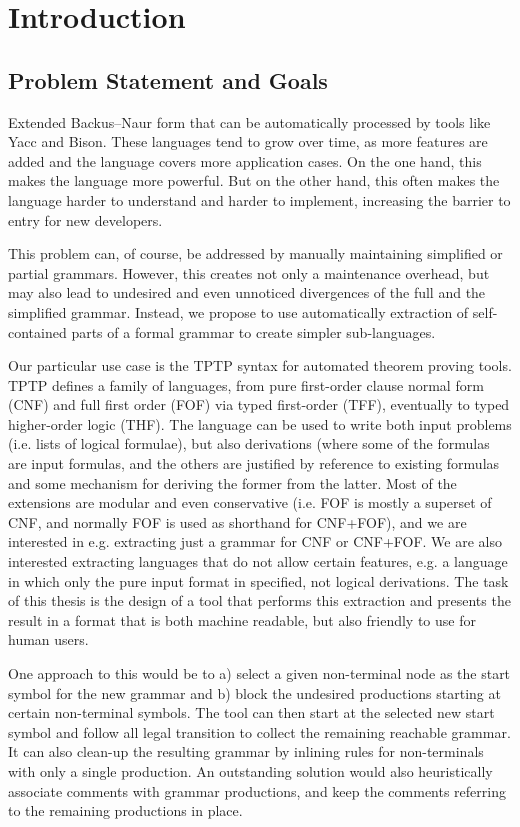 
\chapter{Introduction}\label{cha:Introduction}

\section{Problem Statement and Goals}\label{sec:Aufgabenstellung}
Extended Backus–Naur form that can be automatically processed by tools like Yacc and Bison. These languages tend to grow over time, as more features are added and the language covers more application cases. On the one hand, this makes the language more powerful. But on the other hand, this often makes the language harder to understand and harder to implement, increasing the barrier to entry for new developers.

This problem can, of course, be addressed by manually maintaining simplified or partial grammars. However, this creates not only a maintenance overhead, but may also lead to undesired and even unnoticed divergences of the full and the simplified grammar. Instead, we propose to use automatically extraction of self-contained parts of a formal grammar to create simpler sub-languages.

Our particular use case is the TPTP syntax for automated theorem proving tools. TPTP defines a family of languages, from pure first-order clause normal form (CNF) and full first order (FOF) via typed first-order (TFF), eventually to typed higher-order logic (THF). The language can be used to write both input problems (i.e. lists of logical formulae), but also derivations (where some of the formulas are input formulas, and the others are justified by reference to existing formulas and some mechanism for deriving the former from the latter. Most of the extensions are modular and even conservative (i.e. FOF is mostly a superset of CNF, and normally FOF is used as shorthand for CNF+FOF), and we are interested in e.g. extracting just a grammar for CNF or CNF+FOF. We are also interested extracting languages that do not allow certain features, e.g. a language in which only the pure input format in specified, not logical derivations. The task of this thesis is the design of a tool that performs this extraction and presents the result in a format that is both machine readable, but also friendly to use for human users.

One approach to this would be to a) select a given non-terminal node as the start symbol for the new grammar and b) block the undesired productions starting at certain non-terminal symbols. The tool can then start at the selected new start symbol and follow all legal transition to collect the remaining reachable grammar. It can also clean-up the resulting grammar by inlining rules for non-terminals with only a single production. An outstanding solution would also heuristically associate comments with grammar productions, and keep the comments referring to the remaining productions in place.

